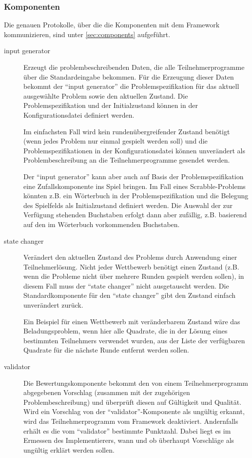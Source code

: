 \documentclass[a4paper, 12pt]{article}
\begin{document}
\subsubsection{Komponenten}

Die genauen Protokolle, über die die Komponenten mit dem Framework
kommunizieren, sind unter \ref{sec:components} aufgeführt.

\begin{description}
  \item[input generator]
    Erzeugt die problembeschreibenden Daten, die alle Teilnehmerprogramme über
    die Standardeingabe bekommen.
    Für die Erzeugung dieser Daten bekommt der ``input generator'' die
    Problemspezifikation für das aktuell ausgewählte Problem sowie den aktuellen
    Zustand.
    Die Problemspezifikation und der Initialzustand können in der
    Konfigurationsdatei definiert werden.

    Im einfachsten Fall wird kein rundenübergreifender Zustand benötigt (wenn
    jedes Problem nur einmal gespielt werden soll) und die
    Problemspezifikationen in der Konfigurationsdatei können unverändert als
    Problembeschreibung an die Teilnehmerprogramme gesendet werden.

    Der ``input generator'' kann aber auch auf Basis der Problemspezifikation
    eine Zufallskomponente ins Spiel bringen. Im Fall eines Scrabble-Problems
    könnten z.B. ein Wörterbuch in der Problemspezifikation und
    die Belegung des Spielfelds als Initialzustand definiert werden.
    Die Auswahl der zur Verfügung stehenden Buchstaben erfolgt dann aber
    zufällig, z.B. basierend auf den im Wörterbuch vorkommenden Buchstaben.

  \item[state changer]
    Verändert den aktuellen Zustand des Problems durch Anwendung einer
    Teilnehmerlösung.
    Nicht jeder Wettbewerb benötigt einen Zustand (z.B. wenn die Probleme nicht
    über mehrere Runden gespielt werden sollen), in diesem Fall muss der ``state
    changer'' nicht ausgetauscht werden. Die Standardkomponente für den ``state
    changer'' gibt den Zustand einfach unverändert zurück.

    Ein Beispiel für einen Wettbewerb mit veränderbarem Zustand wäre das
    Beladungsproblem, wenn hier alle Quadrate, die in der Lösung eines
    bestimmten Teilnehmers verwendet wurden, aus der Liste der verfügbaren
    Quadrate für die nächste Runde entfernt werden sollen.

  \item[validator]
    Die Bewertungskomponente bekommt den von einem Teilnehmerprogramm
    abgegebenen Vor\-schlag (zusammen mit der zugehörigen Problembeschreibung)
    und überprüft diesen auf Gültigkeit und Qualität.
    Wird ein Vorschlag von der ``validator''-Komponente als ungültig erkannt,
    wird das Teilnehmerprogramm vom Framework deaktiviert.
    Andernfalls erhält es die vom ``validator'' bestimmte Punktzahl.
    Dabei liegt es im Ermessen des Implementierers, wann und ob überhaupt
    Vorschläge als ungültig erklärt werden sollen.


\end{description}
\end{document}
